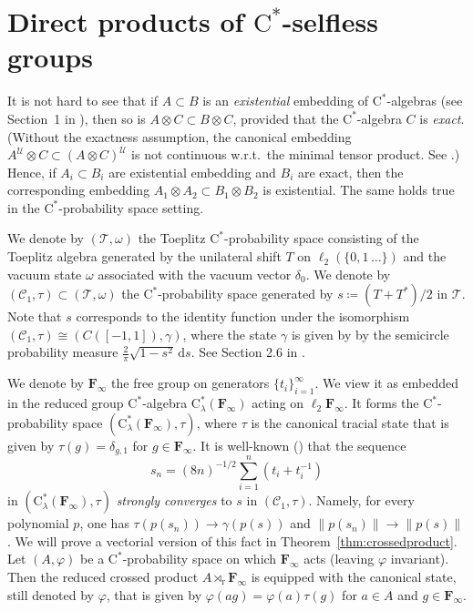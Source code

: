 \documentclass[12pt,nosumlimits,nonamelimits]{amsart}
\theoremstyle{remark}
\theoremstyle{definition}
\newcommand{\bF}{\mathbf{F}}
\newcommand{\cC}{\mathcal{C}}
\newcommand{\cT}{\mathcal{T}}
\newcommand{\cU}{\mathcal{U}}
\newcommand{\vp}{\varphi}
\newcommand{\Ga}{\Gamma}
\begin{document}
%
%
%
\section{Direct products of $\mathrm{C}^*$-selfless groups}\label{sec:dp}
%
It is not hard to see that if $A\subset B$ is an \emph{existential} 
embedding of $\mathrm{C}^*$-alge\-bras (see Section~1 in \cite{robert}), 
then so is $A\otimes C \subset B\otimes C$, provided that 
the $\mathrm{C}^*$-alge\-bra $C$ is \emph{exact}. 
(Without the exactness assumption, 
the canonical embedding $A^\cU\otimes C \subset (A\otimes C)^\cU$
is not continuous w.r.t.\ the minimal tensor product. See \cite{bo}.) 
Hence, if $A_i\subset B_i$ are existential embedding and $B_i$ are exact, 
then the corresponding 
embedding $A_1\otimes A_2 \subset B_1\otimes B_2$ is existential. 
The same holds true in the $\mathrm{C}^*$-prob\-a\-bility space setting. 

We denote by $(\cT,\omega)$ the Toeplitz $\mathrm{C}^*$-prob\-a\-bility space 
consisting of the Toeplitz algebra generated 
by the unilateral shift $T$ on $\ell_2(\{0,1\,\ldots\})$ 
and the vacuum state $\omega$ associated with the vacuum vector $\delta_0$. 
We denote by $(\cC_1,\tau)\subset(\cT,\omega)$ 
the $\mathrm{C}^*$-prob\-a\-bility space generated by $s \coloneq (T+T^*)/2$ in $\cT$. 
Note that $s$ corresponds to the identity function under the 
isomorphism $(\cC_1,\tau) \cong (C([-1,1]),\gamma)$, 
where the state $\gamma$ is given by 
by the semicircle probability measure $\frac{2}{\pi}\sqrt{1-s^2}\,\mathrm{d}s$. 
See Section 2.6 in \cite{vdn}.

We denote by $\bF_\infty$ the free group on 
generators $\{ t_i \}_{i=1}^\infty$. We view it as embedded 
in the reduced group $\mathrm{C}^*$-alge\-bra 
$\mathrm{C}^*_\lambda(\bF_\infty)$ acting on $\ell_2\bF_\infty$. 
It forms the $\mathrm{C}^*$-prob\-a\-bility space 
$(\mathrm{C}^*_\lambda(\bF_\infty),\tau)$, 
where $\tau$ is the canonical tracial state 
that is given by $\tau(g)=\delta_{g,1}$ for $g\in\bF_\infty$.
It is well-known (\cite{vdn}) that the sequence 
\[
s_n = (8n)^{-1/2}\sum_{i=1}^n (t_i+t_i^{-1})
\]
in $(\mathrm{C}^*_\lambda(\bF_\infty),\tau)$ 
\emph{strongly converges} to $s$ in $(\cC_1,\tau)$. 
Namely, for every polynomial $p$, one has 
$\tau(p(s_n))\to\gamma(p(s))$ and $\|p(s_n)\|\to \|p(s)\|$. 
We will prove a vectorial version of this fact in Theorem~\ref{thm:crossedproduct}. 
Let $(A,\vp)$ be a $\mathrm{C}^*$-prob\-a\-bility space on which $\bF_\infty$ acts 
(leaving $\vp$ invariant). 
Then the reduced crossed product $A\rtimes_\mathrm{r}\bF_\infty$ 
is equipped with the canonical state, still denoted by $\vp$, that is given by 
$\vp( a g) = \vp(a)\tau(g)$ for $a\in A$ and $g\in\bF_\infty$. 
\end{document}
